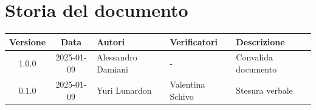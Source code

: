 \section*{Storia del documento}
\begin{tabularx}{\textwidth}{ c c p{2.75cm} p{2.75cm} X }
    \rowcolor{gray!20}\rule{0pt}{0.5cm}\textbf{Versione} & \textbf{Data} & \textbf{Autori} & \textbf{Verificatori} & \textbf{Descrizione} \\[0.7ex]
    \hline
    \rule{0pt}{0.5cm}1.0.0 & 2025-01-09 & Alessandro Damiani & - & Convalida documento\\[0.7ex]
    \hline
    \rule{0pt}{0.5cm}0.1.0 & 2025-01-09 & Yuri Lunardon & Valentina Schivo & Stesura verbale\\[0.7ex]
\end{tabularx} 